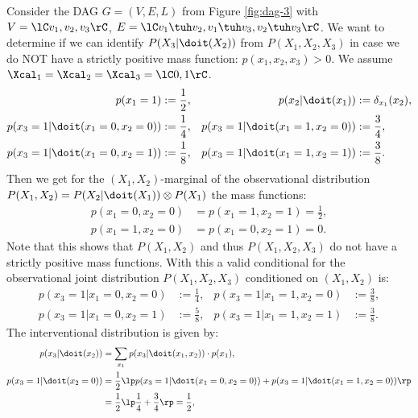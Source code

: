 \begin{Eg}\label{eg:counterexample_nonpositive_backdoor_adjustment}
   Consider the DAG $G=(V,E,L)$ from Figure \ref{fig:dag-3} with $V=\lC v_1,v_2,v_3 \rC$, 
    $E=\lC v_1 \tuh v_2, v_1 \tuh v_3, v_2 \tuh v_3  \rC$.
     We want to determine if we can identify $P(X_3|\doit(X_2))$ from $P(X_1,X_2,X_3)$ in case we do NOT have a strictly positive mass function: $p(x_1,x_2,x_3) >0$. We assume $\Xcal_1=\Xcal_2=\Xcal_3 = \lC 0,1 \rC$.
     \begin{align*}
         p(x_1=1) & := \frac{1}{2}, &
         p(x_2|\doit(x_1)) & := \delta_{x_1}(x_2),\\
         p(x_3=1|\doit(x_1=0,x_2=0)) &:= \frac{1}{4}, & 
         p(x_3=1|\doit(x_1=1,x_2=0)) &:= \frac{3}{4}, \\
         p(x_3=1|\doit(x_1=0,x_2=1)) &:= \frac{1}{8}, &
         p(x_3=1|\doit(x_1=1,x_2=1)) &:= \frac{3}{8}.
     \end{align*}
     Then we get for the $(X_1,X_2)$-marginal of the observational distribution
     $P(X_1,X_2) = P(X_2|\doit(X_1)) \otimes P(X_1)$ the mass functions:
    \begin{align*}
         p(x_1=0,x_2=0) &=  p(x_1=1,x_2=1) = \frac{1}{2}, \\
         p(x_1=1,x_2=0) &=  p(x_1=0,x_2=1) = 0.
    \end{align*}
    Note that this shows that $P(X_1,X_2)$ and thus $P(X_1,X_2,X_3)$ do not have a strictly positive mass functions.
    With this a valid conditional for the observational joint distribution $P(X_1,X_2,X_3)$ conditioned on $(X_1,X_2)$ is:
     \begin{align*}
         p(x_3=1|x_1=0,x_2=0) &:= \frac{1}{4}, & 
         p(x_3=1|x_1=1,x_2=0) &:= \frac{3}{8}, \\
         p(x_3=1|x_1=0,x_2=1) &:= \frac{5}{8}, &
         p(x_3=1|x_1=1,x_2=1) &:= \frac{3}{8}.
     \end{align*}
    The interventional distribution is given by:
     \begin{align*}
         p(x_3|\doit(x_2)) & = \sum_{x_1} p(x_3|\doit(x_1,x_2)) \cdot p(x_1),\\
            p(x_3=1|\doit(x_2=0)) & = \frac{1}{2} \lp p(x_3=1|\doit(x_1=0,x_2=0)) + p(x_3=1|\doit(x_1=1,x_2=0)) \rp  \\
             &=\frac{1}{2} \lp \frac{1}{4} + \frac{3}{4}  \rp = \frac{1}{2} ,\\

\end{align*}
\end{Eg}
